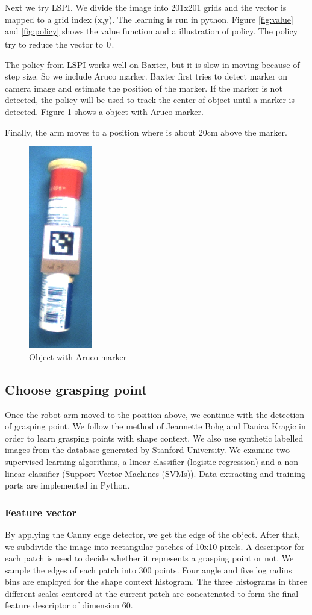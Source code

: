 \documentclass[a4paper, 10pt, conference]{ieeeconf}      %
\begin{document}
Next we try LSPI. We divide the image into 201x201 grids and the vector is mapped to a grid index (x,y). The learning is run in python. Figure \ref{fig:value} and \ref{fig:policy} shows the value function and a illustration of policy. The policy try to reduce the vector to $\vec{0}$.

The policy from LSPI works well on Baxter, but it is slow in moving because of step size. So we include Aruco marker\cite{c11}. Baxter first tries to detect marker on camera image and estimate the position of the marker. If the marker is not detected, the policy will be used to track the center of object until a marker is detected. Figure \ref{fig:marker} shows a object with Aruco marker.

Finally, the arm moves to a position where is about 20cm above the marker. 
\begin{figure}[!htb]
     \centering
     \includegraphics[width=0.1\linewidth]{marker}
      	\caption{\label{fig:marker}Object with Aruco marker}
      \end{figure}
\subsection{Choose grasping point}
Once the robot arm moved to the position above, we continue with the detection of grasping point. We follow the method of Jeannette Bohg and Danica Kragic\cite{c4} in order to learn grasping points with shape context\cite{c5}. We also use synthetic labelled images from the database generated by Stanford University\cite{c6}. We examine two supervised learning algorithms, a linear classifier (logistic regression) and a non-linear classifier (Support Vector Machines (SVMs))\cite{c9}. Data extracting and training parts are implemented in Python.

\subsubsection{Feature vector}
By applying the Canny edge detector, we get the edge of the object. After that, we subdivide the image into rectangular patches of 10x10 pixels. A descriptor for each patch is used to decide whether it represents a grasping point or not. We sample the edges of each patch into 300 points. Four angle and five log radius bins are employed for the shape context histogram. The three histograms in three different scales centered at the current patch are concatenated to form the final feature descriptor of dimension 60.
\end{document}

